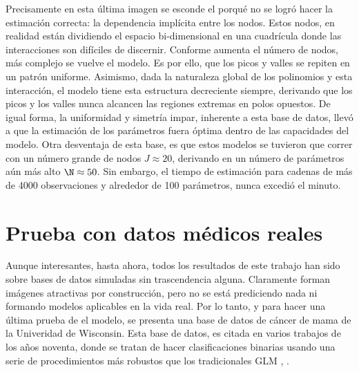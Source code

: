 Precisamente en esta última imagen se esconde el porqué no se logró hacer la estimación correcta: la dependencia implícita entre los nodos. Estos nodos, en realidad están dividiendo el espacio bi-dimensional en una cuadrícula donde las interacciones son difíciles de discernir. Conforme aumenta el número de nodos, más complejo se vuelve el modelo. Es por ello, que los picos y valles se repiten en un patrón uniforme. Asimismo, dada la naturaleza global de los polinomios y esta interacción, el modelo tiene esta estructura decreciente siempre, derivando que los picos y los valles nunca alcancen las regiones extremas en polos opuestos. De igual forma, la uniformidad y simetría impar, inherente a esta base de datos, llevó a que la estimación de los parámetros fuera óptima dentro de las capacidades del modelo. Otra desventaja de esta base, es que estos modelos se tuvieron que correr con un número grande de nodos $J \approx 20$, derivando en un número de parámetros aún más alto $\N \approx 50$. Sin embargo, el tiempo de estimación para cadenas de más de 4000 observaciones y alrededor de 100 parámetros, nunca excedió el minuto. 

\section{Prueba con datos médicos reales}
Aunque interesantes, hasta ahora, todos los resultados de este trabajo han sido sobre bases de datos simuladas sin trascendencia alguna. Claramente forman imágenes atractivas por construcción, pero no se está prediciendo nada ni formando modelos aplicables en la vida real. Por lo tanto, y para hacer una última prueba de el modelo, se presenta una base de datos de cáncer de mama de la Univeridad de Wisconsin. Esta base de datos, es citada en varios trabajos de los años noventa, donde se tratan de hacer clasificaciones binarias usando una serie de procedimientos más robustos que los tradicionales GLM \autocite{mangasarian1990pattern}, \autocite{bennett1992robust}.

